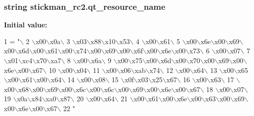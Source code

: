 \subsubsection[{qt\+\_\+resource\+\_\+name}]{\setlength{\rightskip}{0pt plus 5cm}string stickman\+\_\+rc2.\+qt\+\_\+resource\+\_\+name}\label{namespacestickman__rc2_acd9298768cd0172f4ee743276f926790}
{\bfseries Initial value\+:}
\begin{DoxyCode}
1 = \textcolor{stringliteral}{"\(\backslash\)}
2 \textcolor{stringliteral}{\(\backslash\)x00\(\backslash\)x0a\(\backslash\)}
3 \textcolor{stringliteral}{\(\backslash\)x03\(\backslash\)x88\(\backslash\)x10\(\backslash\)x53\(\backslash\)}
4 \textcolor{stringliteral}{\(\backslash\)x00\(\backslash\)x61\(\backslash\)}
5 \textcolor{stringliteral}{\(\backslash\)x00\(\backslash\)x6e\(\backslash\)x00\(\backslash\)x69\(\backslash\)x00\(\backslash\)x6d\(\backslash\)x00\(\backslash\)x61\(\backslash\)x00\(\backslash\)x74\(\backslash\)x00\(\backslash\)x69\(\backslash\)x00\(\backslash\)x6f\(\backslash\)x00\(\backslash\)x6e\(\backslash\)x00\(\backslash\)x73\(\backslash\)}
6 \textcolor{stringliteral}{\(\backslash\)x00\(\backslash\)x07\(\backslash\)}
7 \textcolor{stringliteral}{\(\backslash\)x01\(\backslash\)xc4\(\backslash\)x70\(\backslash\)xa7\(\backslash\)}
8 \textcolor{stringliteral}{\(\backslash\)x00\(\backslash\)x6a\(\backslash\)}
9 \textcolor{stringliteral}{\(\backslash\)x00\(\backslash\)x75\(\backslash\)x00\(\backslash\)x6d\(\backslash\)x00\(\backslash\)x70\(\backslash\)x00\(\backslash\)x69\(\backslash\)x00\(\backslash\)x6e\(\backslash\)x00\(\backslash\)x67\(\backslash\)}
10 \textcolor{stringliteral}{\(\backslash\)x00\(\backslash\)x04\(\backslash\)}
11 \textcolor{stringliteral}{\(\backslash\)x00\(\backslash\)x06\(\backslash\)xab\(\backslash\)x74\(\backslash\)}
12 \textcolor{stringliteral}{\(\backslash\)x00\(\backslash\)x64\(\backslash\)}
13 \textcolor{stringliteral}{\(\backslash\)x00\(\backslash\)x65\(\backslash\)x00\(\backslash\)x61\(\backslash\)x00\(\backslash\)x64\(\backslash\)}
14 \textcolor{stringliteral}{\(\backslash\)x00\(\backslash\)x08\(\backslash\)}
15 \textcolor{stringliteral}{\(\backslash\)x0f\(\backslash\)x03\(\backslash\)x25\(\backslash\)x67\(\backslash\)}
16 \textcolor{stringliteral}{\(\backslash\)x00\(\backslash\)x63\(\backslash\)}
17 \textcolor{stringliteral}{\(\backslash\)x00\(\backslash\)x68\(\backslash\)x00\(\backslash\)x69\(\backslash\)x00\(\backslash\)x6c\(\backslash\)x00\(\backslash\)x6c\(\backslash\)x00\(\backslash\)x69\(\backslash\)x00\(\backslash\)x6e\(\backslash\)x00\(\backslash\)x67\(\backslash\)}
18 \textcolor{stringliteral}{\(\backslash\)x00\(\backslash\)x07\(\backslash\)}
19 \textcolor{stringliteral}{\(\backslash\)x0a\(\backslash\)x84\(\backslash\)xa0\(\backslash\)x87\(\backslash\)}
20 \textcolor{stringliteral}{\(\backslash\)x00\(\backslash\)x64\(\backslash\)}
21 \textcolor{stringliteral}{\(\backslash\)x00\(\backslash\)x61\(\backslash\)x00\(\backslash\)x6e\(\backslash\)x00\(\backslash\)x63\(\backslash\)x00\(\backslash\)x69\(\backslash\)x00\(\backslash\)x6e\(\backslash\)x00\(\backslash\)x67\(\backslash\)}
22 \textcolor{stringliteral}{"}
\end{DoxyCode}
